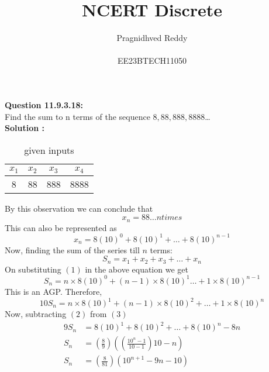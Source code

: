 \documentclass[12pt]{article}
\title{NCERT Discrete}
\author{Pragnidhved Reddy\\\\EE23BTECH11050}
\date{}
\begin{document}
\maketitle
\textbf{Question 11.9.3.18:}\\
 Find the sum to n terms of the sequence $8,88,888,8888$\ldots\\
 \textbf{Solution :}\\
 \begin{table}[H]
 \centering
 \begin{tabular}{|c|c|c|c|}\hline
 $x_1$ & $x_2$ & $x_3$ & $x_4$\\ \hline
 8 & 88 & 888 & 8888\\ \hline
 \end{tabular}
  \caption{given inputs}
 \end{table}
 By this observation we can conclude that $$x_n=88\ldots n times$$
 This can also be represented as 
 \begin{equation}
 \tag{1}
  x_n=8(10)^0+8(10)^1+\ldots+8(10)^{n-1}
  \end{equation}
  Now, finding the sum of the series till $n$ terms:
 $$S_n=x_1+x_2+x_3+\ldots+x_n$$ 
 On substituting $(1)$ in the above equation we get 
\begin{equation}
\tag{2}
 S_n=n\times 8(10)^0+(n-1)\times 8(10)^1\ldots+1\times 8(10)^{n-1}
 \end{equation} 
 This is an AGP. Therefore,
 \begin{equation}
\tag{3}
 10S_n=n\times 8(10)^1+(n-1)\times 8(10)^2+\ldots+1\times 8(10)^n
 \end{equation}
 Now, subtracting $(2)$ from $(3)$
 \begin{align*}
 9S_n&=8(10)^1+8(10)^2+\ldots+8(10)^n-8n\\[10pt]
 S_n&=\left(\frac{8}{9}\right)\left(\left(\frac{10^n-1}{10-1}\right)10-n\right)\\[10pt]
 S_n&=\left(\frac{8}{81}\right)(10^{n+1}-9n-10)
 \end{align*}
 
\end{document}
